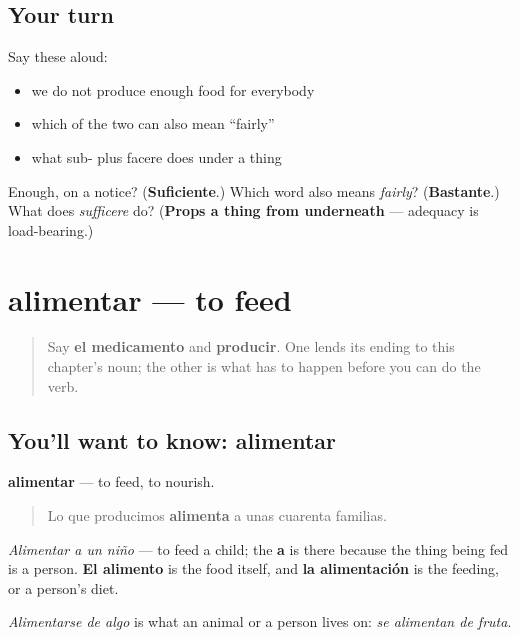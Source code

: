 \subsection*{Your turn}
Say these aloud:

\begin{itemize}
\raggedright
  \item we do not produce enough food for everybody
  \item which of the two can also mean \textquotedblleft{}fairly\textquotedblright{}
  \item what sub- plus facere does under a thing
\end{itemize}

\begin{tcolorbox}[breakable,colback=teal!4,colframe=teal!35!black,title={Before you move on}]
Enough, on a notice? (\textbf{Suficiente}.) Which word also means \emph{fairly}? (\textbf{Bastante}.) What does \emph{sufficere} do? (\textbf{Props a thing from underneath} — adequacy is load-bearing.)
\end{tcolorbox}
\section[alimentar]{alimentar — to feed}

\label{lesson:ES-C467-alimentar}



\begin{quote}
Say \textbf{el medicamento} and \textbf{producir}. One lends its ending to this chapter's noun; the other is what has to happen before you can do the verb.
\end{quote}

\subsection*{You'll want to know: alimentar}
\textbf{alimentar} — to feed, to nourish.

\begin{quote}
Lo que producimos \textbf{alimenta} a unas cuarenta familias.
\end{quote}

\emph{Alimentar a un niño} — to feed a child; the \textbf{a} is there because the thing being fed is a person. \textbf{El alimento} is the food itself, and \textbf{la alimentación} is the feeding, or a person's diet.

\emph{Alimentarse de algo} is what an animal or a person lives on: \emph{se alimentan de fruta}.

